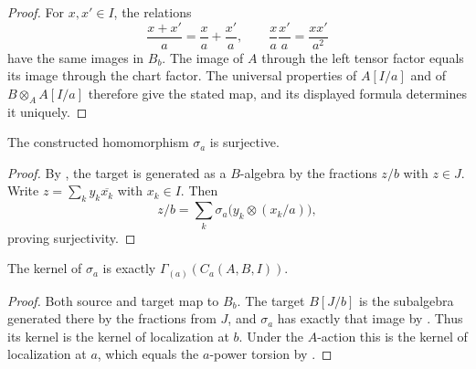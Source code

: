 \begin{proof}
  For $x,x'\in I$, the relations
  \[
    \frac{x+x'}a=\frac xa+\frac{x'}a,
    \qquad
    \frac xa\frac{x'}a=\frac{xx'}{a^2}
  \]
  have the same images in $B_b$.  The image of $A$ through the left tensor
  factor equals its image through the chart factor.  The universal properties
  of $A[I/a]$ and of $B\otimes_AA[I/a]$ therefore give the stated map, and
  its displayed formula determines it uniquely.
\end{proof}

\begin{lemma}
  \label{lemma:nagata-strict-chart-map-surjective}

  The constructed homomorphism $\sigma_a$ is surjective.
\end{lemma}

\begin{proof}
  By , the target is generated as a
  $B$-algebra by the fractions $z/b$ with $z\in J$.  Write
  $z=\sum_k y_k\overline{x_k}$ with $x_k\in I$.  Then
  \[
    z/b=\sum_k\sigma_a\bigl(y_k\otimes(x_k/a)\bigr),
  \]
  proving surjectivity.
\end{proof}

\begin{lemma}
  \label{lemma:nagata-strict-chart-map-kernel}

  The kernel of $\sigma_a$ is exactly
  $\Gamma_{(a)}(C_a(A,B,I))$.
\end{lemma}

\begin{proof}
  Both source and target map to $B_b$.  The target $B[J/b]$ is the subalgebra
  generated there by the fractions from $J$, and $\sigma_a$ has exactly that
  image by .  Thus its kernel
  is the kernel of localization at $b$.  Under the $A$-action this is the
  kernel of localization at $a$, which equals the $a$-power torsion by
  .
\end{proof}

